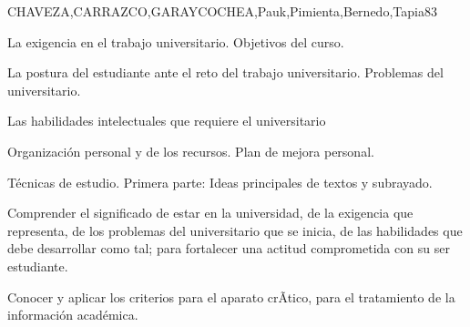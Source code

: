 \begin{syllabus}
\begin{outcomes}
\end{outcomes}

\begin{unit}{}{CHAVEZA,CARRAZCO,GARAYCOCHEA,Pauk,Pimienta,Bernedo,Tapia}{8}{3}
\begin{topics}
        \item La exigencia en el trabajo universitario. Objetivos del curso.
        \item La postura del estudiante ante el reto del trabajo universitario. Problemas  del universitario.     
        \item Las  habilidades intelectuales que requiere el universitario
        \item Organización personal y de los recursos. Plan de mejora personal.
        \item Técnicas de estudio. Primera parte: Ideas principales de textos y subrayado.       
\end{topics}
\begin{unitgoals}
        \item Comprender el  significado de estar en  la universidad, de la exigencia que representa, de los problemas del universitario que se inicia, de las habilidades que debe desarrollar como tal; para fortalecer una actitud comprometida con su ser estudiante.
        \item Conocer y aplicar los criterios para el aparato crÃ­tico, para el tratamiento de la información académica.
\end{unitgoals}
\end{unit}


\end{syllabus}
